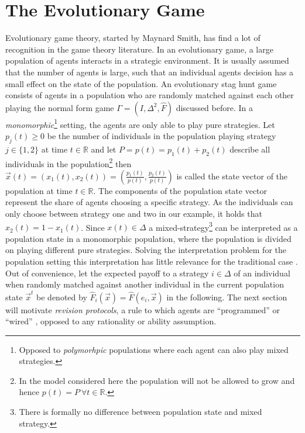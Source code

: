 \documentclass[11pt]{article}
\newcommand{\realnumb}{\mathbb{R}}
\begin{document}
\section{The Evolutionary Game}
\label{sec:evolutionarystaghunt}
Evolutionary game theory, started by Maynard Smith, has find a lot of 
recognition in the game theory literature. 
In an evolutionary game, a large population of agents interacts in a 
strategic environment. It is usually assumed that the number of agents is 
large, such that an individual agents decision has a small effect on the
state of the population. 
An evolutionary stag hunt game consists of agents in a population who
are randomly matched against each other playing the normal form game 
$\Gamma = (I,\Delta^2,\hat{F})$ discussed before. In a \textit{monomorphic}\footnote{
Opposed to \textit{polymorhpic} populations where each agent can also 
play mixed strategies.} setting, the agents are only able to play pure 
strategies. Let $p_j(t) \geq 0$ be the number of individuals in the population
playing strategy $j \in \{1,2\}$ at time $t \in \realnumb$ and 
let $P = p(t) = p_1(t) + p_2(t)$ describe all individuals 
in the population\footnote{In the model considered here the population will 
not be allowed to grow and hence $p(t) = P\  \forall t \in \realnumb$.}
then $\vec{x}(t) = \left(x_1(t),x_2(t)\right)
=\left(\frac{p_1(t)}{p(t)},\frac{p_2(t)}{p(t)}\right)$ 
is called the state vector of the population at
time $t \in \realnumb$. The components of the population state vector represent
the share of agents choosing a specific strategy. 
As the individuals can only choose between strategy one and two in our example,
it holds that  $x_2(t) = 1-x_1(t)$. Since $x(t) \in \Delta$ a 
mixed-strategy\footnote{There is formally no difference between population 
state and mixed strategy.} can 
be interpreted as a population state in a monomorphic population, where the 
population is divided on playing different pure strategies. 
Solving the interpretation problem for the population setting this 
interpretation has little relevance for the traditional case 
\parencite[914-915]{rubinstein_comments_1991}. 
Out of convenience, let the expected payoff 
to a strategy $i \in \Delta$ of an individual when randomly matched
against another individual in the current population state $\vec{x}^t$ 
be denoted by $\hat{F}_i(\vec{x}) = \hat{F}(e_i,\vec{x})$ in the following.
The next section will motivate \textit{revision protocols}, a rule to
which agents are ``programmed'' or ``wired'' \parencite{gintis_game_2000}, 
opposed to any rationality or ability assumption. 
\end{document}
